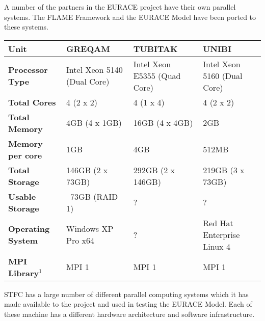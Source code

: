 \label{app:parallel-systems}
A number of the partners in the EURACE project have their own parallel systems. The FLAME Framework and the EURACE Model have been ported to these systems.
\begin{table}[ht]
\renewcommand{\arraystretch}{1.2}
	\centering
	{\scriptsize
		\begin{tabular}{|l|l|l|l|}\hline
	\bf	Unit &	\bf GREQAM &\bf	 TUBITAK &\bf	 UNIBI\\\hline
\bf Processor Type 	& Intel Xeon 5140 (Dual Core)&	Intel Xeon E5355 (Quad Core) &	Intel Xeon 5160 (Dual Core)\\\hline
\bf Total Cores 	&4 (2 x 2) &	4 (1 x 4) &	4 (2 x 2)\\\hline
\bf Total Memory &	4GB (4 x 1GB) &	16GB (4 x 4GB) &	2GB\\\hline
\bf Memory per core &	1GB &	4GB &	512MB\\\hline
\bf Total Storage &	146GB (2 x 73GB) &	292GB (2 x 146GB) &	219GB (3 x 73GB)\\\hline
\bf Usable Storage &	~73GB (RAID 1) &	 ? &	 ?\\\hline
\bf Operating System &	Windows XP Pro x64 &	 ? &	Red Hat Enterprise Linux 4\\\hline
\bf MPI Library$^1$ 	& MPI 1 &	 MPI 1 &	 MPI 1 \\\hline
			
		\end{tabular}
		}
\end{table}
STFC has a large number of different parallel computing systems which it has made available to the project and used in testing the EURACE Model. Each of these machine has a different hardware architecture and software infrastructure.
